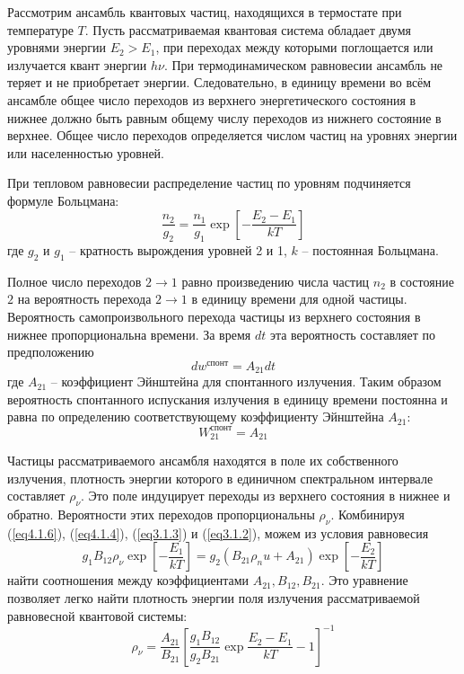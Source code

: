 
Рассмотрим ансамбль квантовых частиц, находящихся в термостате при 
температуре \( T \). Пусть рассматриваемая квантовая система обладает двумя 
уровнями энергии \( E_2 > E_1 \), при переходах между которыми поглощается 
или излучается квант энергии \( h\nu \). При термодинамическом равновесии 
ансамбль не теряет и не приобретает энергии. Следовательно, в единицу времени 
во всём ансамбле общее число переходов из верхнего энергетического состояния 
в нижнее должно быть равным общему числу переходов из нижнего состояние в 
верхнее. Общее число переходов определяется числом частиц на уровнях энергии 
или населенностью уровней. 

При тепловом равновесии распределение частиц по уровням подчиняется формуле 
Больцмана:
\begin{equation}
	\frac{n_2}{g_2} = \frac{n_1}{g_1}\exp
		\left[ -\frac{E_2 - E_1}{kT}\right]
	\label{eq4.1.4}
\end{equation}
где \( g_2 \) и \( g_1 \) -- кратность вырождения уровней 2 и 1, 
\( k \) -- постоянная Больцмана.

Полное число переходов \( 2 \rightarrow 1 \) равно произведению числа частиц 
\( n_2 \) в состояние \( 2 \) на вероятность перехода \( 2 \rightarrow 1 \) 
в единицу времени для одной частицы. Вероятность самопроизвольного перехода 
частицы из верхнего состояния в нижнее пропорциональна времени. За время 
\( dt \) эта вероятность составляет по предположению
\[
	dw^\text{спонт} = A_{21} dt
\]
где \( A_{21} \) -- коэффициент Эйнштейна для спонтанного излучения. Таким 
образом вероятность спонтанного испускания излучения в единицу времени 
постоянна и равна по определению соответствующему коэффициенту Эйнштейна 
\( A_{21} \):
\begin{equation}
	W_{21}^\text{спонт} = A_{21}
	\label{eq4.1.6}
\end{equation}

Частицы рассматриваемого ансамбля находятся в поле их собственного излучения, 
плотность энергии которого в единичном спектральном интервале составляет 
\( \rho_\nu \). Это поле индуцирует переходы из верхнего состояния в нижнее 
и обратно. Вероятности этих переходов пропорциональны \( \rho_\nu \). 
Комбинируя (\ref{eq4.1.6}), (\ref{eq4.1.4}), (\ref{eq3.1.3}) и (\ref{eq3.1.2}), 
можем из условия равновесия
\[
	g_1 B_{12} \rho_\nu \exp\left[ -\frac{E_1}{kT} \right] = 
	g_2 \left( B_{21}\rho_nu + A_{21} \right)
		\exp\left[ -\frac{E_2}{kT} \right]
\]
найти соотношения между коэффициентами \( A_{21}, B_{12}, B_{21} \). Это 
уравнение позволяет легко найти плотность энергии поля излучения 
рассматриваемой равновесной квантовой системы:
\[
	\rho_\nu = \frac{A_{21}}{B_{21}}
		\left[ 
			\frac{g_1 B_{12}}{g_2 B_{21}}\exp\frac{E_2 - E_1}{kT} - 1 
		\right]^{-1}
\]

